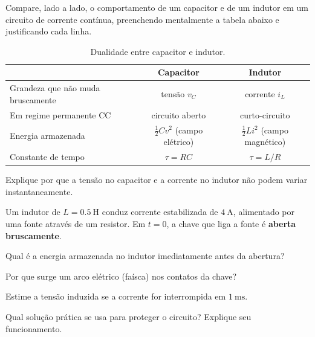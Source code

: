 \blocoaprofundamento
\begin{questao}[3]{}

Compare, lado a lado, o comportamento de um capacitor e de um indutor em um
circuito de corrente contínua, preenchendo mentalmente a tabela abaixo e
justificando cada linha.

\begin{table}[H]
\centering
\small\sffamily
\setlength{\arraystretch}{1.3}
\begin{tabular}{@{}l c c@{}}
\toprule
 & \textbf{Capacitor} & \textbf{Indutor}\\
\midrule
Grandeza que não muda bruscamente & tensão $v_C$ & corrente $i_L$\\
Em regime permanente CC & circuito aberto & curto-circuito\\
Energia armazenada & $\tfrac12 C v^2$ (campo elétrico) & $\tfrac12 L i^2$ (campo magnético)\\
Constante de tempo & $\tau = RC$ & $\tau = L/R$\\
\bottomrule
\end{tabular}
\caption{Dualidade entre capacitor e indutor.}
\end{table}

Explique por que a tensão no capacitor e a corrente no indutor não podem variar
instantaneamente.


\end{questao}
\begin{questao}[3]{}

Um indutor de $L = \SI{0.5}{\henry}$ conduz corrente estabilizada de
$\SI{4}{\ampere}$, alimentado por uma fonte através de um resistor. Em
$t=0$, a chave que liga a fonte é \textbf{aberta bruscamente}.
\begin{itensq}
\item Qual é a energia armazenada no indutor imediatamente antes da abertura?
\item Por que surge um arco elétrico (faísca) nos contatos da chave?
\item Estime a tensão induzida se a corrente for interrompida em
      $\SI{1}{\milli\second}$.
\item Qual solução prática se usa para proteger o circuito? Explique seu
      funcionamento.
\end{itensq}


\end{questao}
